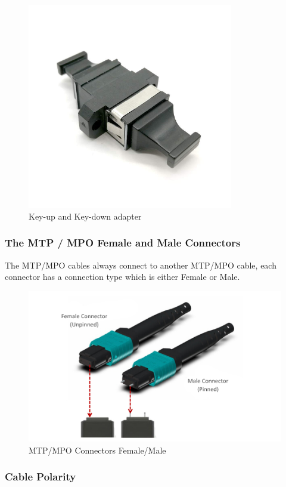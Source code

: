 \begin{figure}
  \includegraphics[width=9cm]{images/4.jpg}
  \centering
  \caption{Key-up and Key-down adapter}
  \label{fig:jlsimon}
\end{figure}

\subsubsection{The MTP / MPO Female and Male Connectors}

The MTP/MPO cables always connect to another MTP/MPO cable, each connector has a connection type which is either Female or Male.

\begin{figure}
  \includegraphics[width=\textwidth]{images/5.jpeg}
  \caption{MTP/MPO Connectors Female/Male}
  \label{fig:jlsimon}
\end{figure}


\subsubsection{Cable Polarity}

